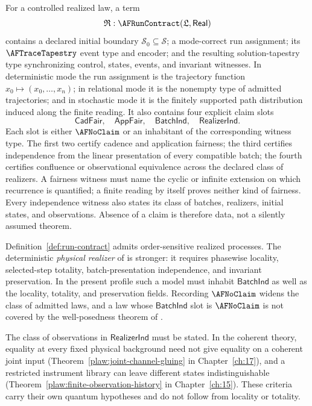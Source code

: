 \begin{definition}
\label{def:run-contract}
For a controlled realized law, a term
\[
 \mathfrak R:\AFRunContract(\mathfrak L,\mathsf{Real})
\]
contains a declared initial boundary
$\mathcal S_0\subseteq\mathcal S$; a mode-correct run assignment; its
$\AFTraceTapestry$ event type and encoder;
and the resulting solution-tapestry type synchronizing control, states,
events, and invariant witnesses.  In deterministic mode the run assignment
is the trajectory function $x_0\mapsto(x_0,\ldots,x_n)$; in relational mode
it is the nonempty type of admitted trajectories; and in stochastic mode it
is the finitely supported path distribution induced along the finite reading.
It also contains four explicit claim slots
\[
 \mathsf{CadFair},\quad \mathsf{AppFair},\quad
 \mathsf{BatchInd},\quad \mathsf{RealizerInd}.
\]
Each slot is either $\AFNoClaim$ or an inhabitant of the corresponding witness
type.  The first two certify cadence and application fairness; the third
certifies independence from the linear presentation of every compatible
batch; the fourth certifies confluence or observational equivalence across the
declared class of realizers.  A fairness witness must name the cyclic or
infinite extension on which recurrence is quantified; a finite reading by
itself proves neither kind of fairness.  Every independence witness also
states its class of batches, realizers, initial states, and observations.
Absence of a claim is therefore data, not a silently assumed theorem.
\end{definition}

Definition~\ref{def:run-contract} admits order-sensitive realized processes.
The deterministic \emph{physical realizer} of \cite{ToyElectrodynamics} is
stronger: it requires phasewise locality, selected-step totality,
batch-presentation independence, and invariant preservation.  In the present
profile such a model must inhabit $\mathsf{BatchInd}$ as well as the
locality, totality, and preservation fields.  Recording $\AFNoClaim$ widens
the class of admitted laws, and a law whose $\mathsf{BatchInd}$ slot is
$\AFNoClaim$ is not covered by the well-posedness theorem of
\cite{ToyElectrodynamics}.

The class of observations in $\mathsf{RealizerInd}$ must be stated.  In the
coherent theory, equality at every fixed physical background need not give
equality on a coherent joint input (Theorem~\ref{plaw:joint-channel-gluing}
in Chapter~\ref{ch:17}), and a restricted instrument library can leave
different states indistinguishable
(Theorem~\ref{plaw:finite-observation-history} in Chapter~\ref{ch:15}).
These criteria carry their own quantum hypotheses and do not follow from
locality or totality.

